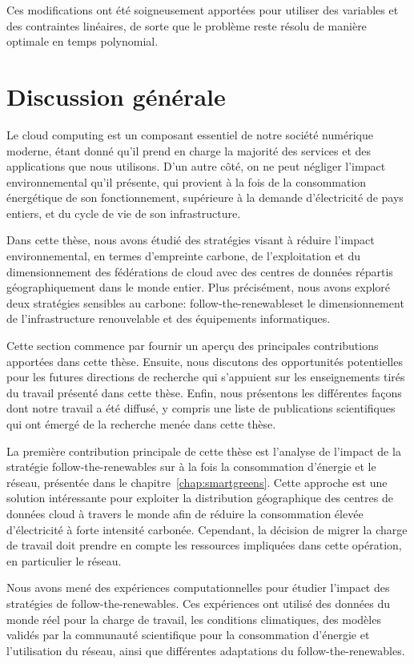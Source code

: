 Ces modifications ont été soigneusement apportées pour utiliser des variables et des contraintes linéaires, de sorte que le problème reste résolu de manière optimale en temps polynomial.


\section{Discussion générale }

Le cloud computing est un composant essentiel de notre société numérique moderne, étant donné qu'il prend en charge la majorité des services et des applications que nous utilisons. D'un autre côté, on ne peut négliger l'impact environnemental qu'il présente, qui provient à la fois de la consommation énergétique de son fonctionnement, supérieure à la demande d'électricité de pays entiers, et du cycle de vie de son infrastructure.

Dans cette thèse, nous avons étudié des stratégies visant à réduire l'impact environnemental, en termes d'empreinte carbone, de l'exploitation et du dimensionnement des fédérations de cloud avec des centres de données répartis géographiquement dans le monde entier. Plus précisément, nous avons exploré deux stratégies sensibles au carbone: \guillemotleft follow-the-renewables\guillemotright et le dimensionnement de l'infrastructure renouvelable et des équipements informatiques.

Cette section commence par fournir un aperçu des principales contributions apportées dans cette thèse. Ensuite, nous discutons des opportunités potentielles pour les futures directions de recherche qui s'appuient sur les enseignements tirés du travail présenté dans cette thèse. Enfin, nous présentons les différentes façons dont notre travail a été diffusé, y compris une liste de publications scientifiques qui ont émergé de la recherche menée dans cette thèse.

La première contribution principale de cette thèse est l'analyse de l'impact de la stratégie follow-the-renewables sur à la fois la consommation d'énergie et le réseau, présentée dans le chapitre~\ref{chap:smartgreens}. Cette approche est une solution intéressante pour exploiter la distribution géographique des centres de données cloud à travers le monde afin de réduire la consommation élevée d'électricité à forte intensité carbonée. Cependant, la décision de migrer la charge de travail doit prendre en compte les ressources impliquées dans cette opération, en particulier le réseau.

Nous avons mené des expériences computationnelles pour étudier l'impact des stratégies de follow-the-renewables. Ces expériences ont utilisé des données du monde réel pour la charge de travail, les conditions climatiques, des modèles validés par la communauté scientifique pour la consommation d'énergie et l'utilisation du réseau, ainsi que différentes adaptations du follow-the-renewables.


